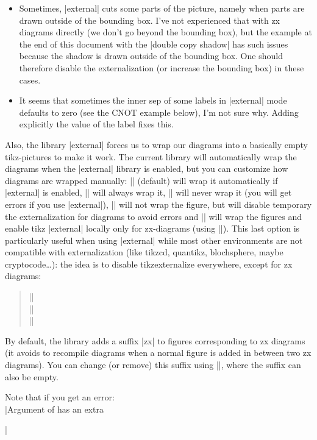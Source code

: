 \documentclass[a4paper,doc2]{ltxdoc} %
\begin{document}
{\begin{itemize}
\item Sometimes, |external| cuts some parts of the picture, namely when parts are drawn outside of the bounding box. I've not experienced that with zx diagrams directly (we don't go beyond the bounding box), but the example at the end of this document with the |double copy shadow| has such issues because the shadow is drawn outside of the bounding box. One should therefore disable the externalization (or increase the bounding box) in these cases.
\item It seems that sometimes the inner sep of some labels in |external| mode defaults to zero (see the CNOT example below), I'm not sure why. Adding explicitly the value of the label fixes this.
\end{itemize}

\begin{pgfmanualentry}
  \extractcommand\zxExternalAuto\@@
  \extractcommand\zxExternalWrap\@@
  \extractcommand\zxExternalNoWrap\@@
  \extractcommand\zxExternalNoWrapNoExt\@@
  \extractcommand\zxExternalWrapForceExt\@@
  \pgfmanualbody
  Also, the library |external| forces us to wrap our diagrams into a basically empty tikz-pictures to make it work. The current library will automatically wrap the diagrams when the |external| library is enabled, but you can customize how diagrams are wrapped manually: |\zxExternalAuto| (default) will wrap it automatically if |external| is enabled, |\zxExternalWrap| will always wrap it, |\zxExternalNoWrap| will never wrap it (you will get errors if you use |external|), |\zxExternalNoWrapNoExt| will not wrap the figure, but will disable temporary the externalization for diagrams to avoid errors and |\zxExternalWrapForceExt| will wrap the figures and enable tikz |external| locally only for zx-diagrams (using |\tikzexternalenable|). This last option is particularly useful when using |external| while most other environments are not compatible with externalization (like tikzcd, quantikz, blochsphere, maybe cryptocode\dots{}): the idea is to disable tikzexternalize everywhere, except for zx diagrams:
\begin{verse}
|\tikzexternalize|\\
|\tikzexternaldisable|\\
|\zxExternalWrapForceExt|
\end{verse}
\end{pgfmanualentry}

\begin{pgfmanualentry}
  \extractcommand\zxExternalSuffix{}\@@
  \pgfmanualbody
By default, the library adds a suffix |zx| to figures corresponding to zx diagrams (it avoids to recompile diagrams when a normal figure is added in between two zx diagrams). You can change (or remove) this suffix using ||, where the suffix can also be empty.
\end{pgfmanualentry}

Note that if you get an error:\\
|Argument of \tikzexternal@laTeX@collect@until@end@tikzpicture has an extra }|\\
\end{document}
